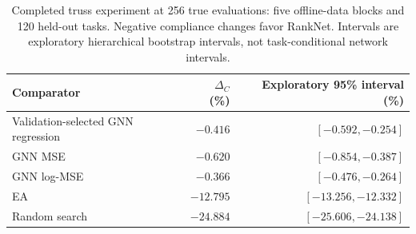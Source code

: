 \begin{table}[tb]
\centering\small
\caption{Completed truss experiment at 256 true evaluations: five offline-data blocks and 120 held-out tasks. Negative compliance changes favor RankNet. Intervals are exploratory hierarchical bootstrap intervals, not task-conditional network intervals.}
\label{tab:truss}
\begin{tabular}{lrr}\toprule
Comparator & $\Delta_C$ (\%) & Exploratory 95\% interval (\%)\\\midrule
Validation-selected GNN regression & $-0.416$ & $[-0.592, -0.254]$\\
GNN MSE & $-0.620$ & $[-0.854, -0.387]$\\
GNN log-MSE & $-0.366$ & $[-0.476, -0.264]$\\
EA & $-12.795$ & $[-13.256, -12.332]$\\
Random search & $-24.884$ & $[-25.606, -24.138]$\\
\bottomrule\end{tabular}
\end{table}
